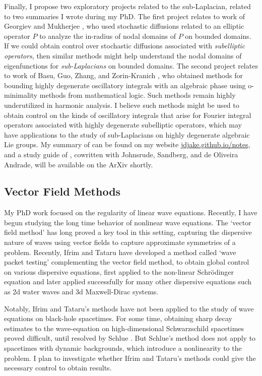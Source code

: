 \documentclass[11pt]{article}
\theoremstyle{definition}
\begin{document}
Finally, I propose two exploratory projects related to the sub-Laplacian, related to two summaries I wrote during my PhD. The first project relates to work of Georgiev and Mukherjee \cite{GeorgievMukherjee}, who used stochastic diffusions related to an elliptic operator $P$ to analyze the in-radius of nodal domains of $P$ on bounded domains. If we could obtain control over stochastic diffusions associated with \emph{subelliptic operators}, then similar methods might help understand the nodal domains of eigenfunctions for \emph{sub-Laplacians} on bounded domains. The second project relates to work of Basu, Guo, Zhang, and Zorin-Kranich \cite{BasuGuoZhangZorinKranich}, who obtained methods for bounding highly degenerate oscillatory integrals with an algebraic phase using o-minimality methods from mathematical logic. Such methods remain highly underutilized in harmonic analysis. I believe such methods might be used to obtain control on the kinds of oscillatory integrals that arise for Fourier integral operators associated with highly degenerate subelliptic operators, which may have applications to the study of sub-Laplacians on highly degenerate algebraic Lie groups. My summary of \cite{GeorgievMukherjee} can be found on my website \href{jdjake.github.io/notes}{jdjake.github.io/notes}, and a study guide of \cite{BasuGuoZhangZorinKranich}, cowritten with Johnsrude, Sandberg, and de Oliveira Andrade, will be available on the ArXiv shortly.

\subsection*{Vector Field Methods}
\vspace{-0.2em}
My PhD work focused on the regularity of linear wave equations. Recently, I have begun studying the long time behavior of nonlinear wave equations. The `vector field method' has long proved a key tool in this setting, capturing the dispersive nature of waves using vector fields to capture approximate symmetries of a problem. Recently, Ifrim and Tataru \cite{IfrimTataruWaterWaves} have developed a method called `wave packet testing' complementing the vector field method, to obtain global control on various dispersive equations, first applied to the non-linear Schr\"{o}dinger equation %
and later applied successfully for many other dispersive equations such as 2d water waves and 3d Maxwell-Dirac systems.

Notably, Ifrim and Tataru's methods have not been applied to the study of wave equations on black-hole spacetimes. For some time, obtaining sharp decay estimates to the wave-equation on high-dimensional Schwarzschild spacetimes proved difficult, until resolved by Schlue \cite{Schlue}. But Schlue's method does not apply to spacetimes with dynamic backgrounds, which introduce a nonlinearity to the problem. I plan to investigate whether Ifrim and Tataru's methods could give the necessary control to obtain results.
\end{document}
